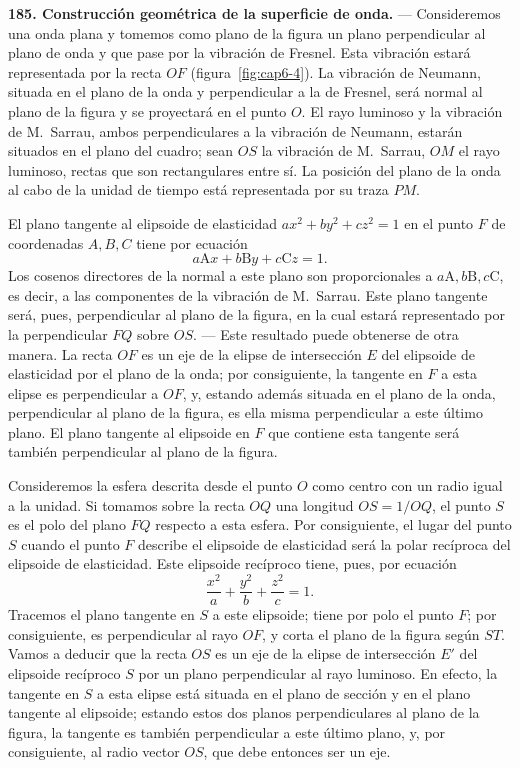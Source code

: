 \noindent\textbf{185. Construcción geométrica de la superficie de onda.}
— Consideremos una onda plana y tomemos como plano de la figura un plano
perpendicular al plano de onda y que pase por la vibración de Fresnel.
Esta vibración estará representada por la recta $OF$ (figura~\ref{fig:cap6-4}).
La vibración de Neumann, situada en el plano de la onda y perpendicular a
la de Fresnel, será normal al plano de la figura y se proyectará en el
punto $O$. El rayo luminoso y la vibración de M.~Sarrau, ambos
perpendiculares a la vibración de Neumann, estarán situados en el plano
del cuadro; sean $OS$ la vibración de M.~Sarrau, $OM$ el rayo luminoso,
rectas que son rectangulares entre sí. La posición del plano de la onda
al cabo de la unidad de tiempo está representada por su traza $PM$.

El plano tangente al elipsoide de elasticidad $ax^2+by^2+cz^2=1$ en el
punto $F$ de coordenadas $A,B,C$ tiene por ecuación
\[
a\mathrm Ax+b\mathrm By+c\mathrm Cz=1.
\]
Los cosenos directores de la normal a este plano son proporcionales a
$a\mathrm A,b\mathrm B,c\mathrm C$, es decir, a las componentes de la
vibración de M.~Sarrau. Este plano tangente será, pues, perpendicular al
plano de la figura, en la cual estará representado por la perpendicular
$FQ$ sobre $OS$. — Este resultado puede obtenerse de otra manera. La
recta $OF$ es un eje de la elipse de intersección $E$ del elipsoide de
elasticidad por el plano de la onda; por consiguiente, la tangente en $F$
a esta elipse es perpendicular a $OF$, y, estando además situada en el
plano de la onda, perpendicular al plano de la figura, es ella misma
perpendicular a este último plano. El plano tangente al elipsoide en $F$
que contiene esta tangente será también perpendicular al plano de la
figura.

Consideremos la esfera descrita desde el punto $O$ como centro con un
radio igual a la unidad. Si tomamos sobre la recta $OQ$ una longitud
$OS=1/OQ$, el punto $S$ es el polo del plano $FQ$ respecto a esta esfera.
Por consiguiente, el lugar del punto $S$ cuando el punto $F$ describe el
elipsoide de elasticidad será la polar recíproca del elipsoide de
elasticidad. Este elipsoide recíproco tiene, pues, por ecuación
\[
\frac{x^2}{a}+\frac{y^2}{b}+\frac{z^2}{c}=1.
\]
Tracemos el plano tangente en $S$ a este elipsoide; tiene por polo el
punto $F$; por consiguiente, es perpendicular al rayo $OF$, y corta el
plano de la figura según $ST$. Vamos a deducir que la recta $OS$ es un
eje de la elipse de intersección $E'$ del elipsoide recíproco $S$ por un
plano perpendicular al rayo luminoso. En efecto, la tangente en $S$ a esta
elipse está situada en el plano de sección y en el plano tangente al
elipsoide; estando estos dos planos perpendiculares al plano de la
figura, la tangente es también perpendicular a este último plano, y, por
consiguiente, al radio vector $OS$, que debe entonces ser un eje.

